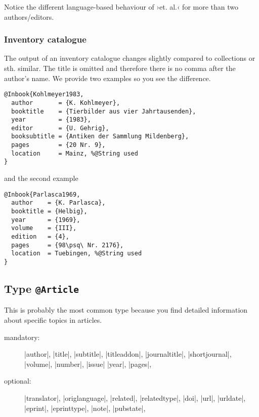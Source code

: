 \documentclass[a4paper,
10pt,
greek,
french,
spanish,
italian,
ngerman,
english
]{ltxdoc}
\begin{document}
Notice the different language-based behaviour of ›et. al.‹ for more than two authors/editors.

 
 
 \subsubsection{Inventory catalogue}
The output of an inventory catalogue changes slightly compared to collections or sth. similar. 
The title is omitted and therefore there is no comma after the author’s name.
We provide two examples so you see the difference.
\begin{lstlisting}[style=bibentry,label=Kohlmeyer1983,caption={{@}Inbook\{Kohlmeyer1983,…\} }]
@Inbook{Kohlmeyer1983,
  author       = {K. Kohlmeyer},
  booktitle    = {Tierbilder aus vier Jahrtausenden},
  year         = {1983},
  editor       = {U. Gehrig},
  booksubtitle = {Antiken der Sammlung Mildenberg},
  pages        = {20 Nr. 9},
  location     = Mainz, %@String used
}
\end{lstlisting}
and the second example

\begin{lstlisting}[style=bibentry,label=Parlasca1969,caption={{@}Inbook\{Parlasca1969,…\} }]
@Inbook{Parlasca1969,
  author    = {K. Parlasca},
  booktitle = {Helbig},
  year      = {1969},
  volume    = {III},
  edition   = {4},
  pages     = {98\psq\ Nr. 2176},
  location  = Tuebingen, %@String used
}
\end{lstlisting}


\begin{refsection}\end{refsection}

\subsection{Type \texttt{@Article}}\label{article}
 This is probably the most common type because you find detailed information about specific topics in articles.


\begin{description}
\item[mandatory:] 
|author|, |title|, |subtitle|, |titleaddon|,
|journaltitle|, |shortjournal|, |volume|, |number|, |issue|
|year|, |pages|, 
\item[optional:]
|translator|, |origlanguage|,
|related|, |relatedtype|,
|doi|, |url|, |urldate|, |eprint|, |eprinttype|, |note|, |pubstate|, 
 \end{description}
\end{document}
